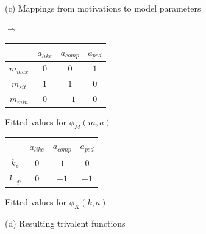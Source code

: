 \documentclass{article}
\begin{document}
\begin{minipage}{20.0cm}
\begin{minipage}{9.0cm}
\vspace{.2cm}


\hspace{.4cm }(c) Mappings from motivations to model parameters



\end{minipage}
\begin{minipage}{11.0cm}
\begin{minipage}{6.1cm}

\renewcommand*{\arraystretch}{1.4}

{\Large \hspace{-0.1cm }$\Rightarrow$}\hspace{0.7cm }\begin{tabular}{|c|ccc|}
\hline
 & $a_{like}$ & $a_{comp}$  & $a_{ped}$ \\
\hline
$m_{max}$ &  {\color{black}$0$}  &  {\color{black}$0$} & {\color{darkgreen}$1$} \\
$m_{sit}$ & {\color{darkgreen}$1$}  & {\color{darkgreen}$1$}& {\color{black}$0$} \\
$m_{min}$ & {\color{black}$0$}   &   {\color{red}$-1$} &  {\color{black}$0$}\\
\hline
\end{tabular}

\vspace{.2cm}

 \hspace{1.3cm}Fitted values for $\phi_M(m,a)$




\end{minipage}
\begin{minipage}{4.9cm}

\renewcommand*{\arraystretch}{1.86}
\begin{tabular}{|c|ccc|}
\hline
 & $a_{like}$ & $a_{comp}$  & $a_{ped}$ \\
\hline
$k_{p}$ &   {\color{black}$0$} &  {\color{darkgreen}$1$} &  {\color{black}$0$}\\
$k_{\neg p}$ &  {\color{black}$0$}  &  {\color{red}$-1$} & {\color{red}$-1$} \\
\hline
\end{tabular}

\vspace{.3cm}

 \hspace{0.2cm}Fitted values for $\phi_K(k,a)$


\end{minipage}

\vspace{.4cm}

\hspace{3.1cm}(d) Resulting trivalent functions

\end{minipage}









\end{minipage}
\end{document}
